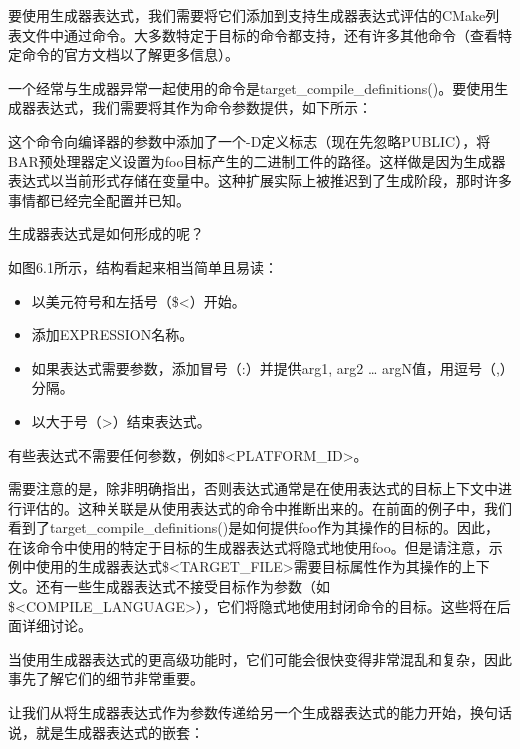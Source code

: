 
要使用生成器表达式，我们需要将它们添加到支持生成器表达式评估的CMake列表文件中通过命令。大多数特定于目标的命令都支持，还有许多其他命令（查看特定命令的官方文档以了解更多信息）。

一个经常与生成器异常一起使用的命令是target\_compile\_definitions()。要使用生成器表达式，我们需要将其作为命令参数提供，如下所示：


这个命令向编译器的参数中添加了一个-D定义标志（现在先忽略PUBLIC），将BAR预处理器定义设置为foo目标产生的二进制工件的路径。这样做是因为生成器表达式以当前形式存储在变量中。这种扩展实际上被推迟到了生成阶段，那时许多事情都已经完全配置并已知。

生成器表达式是如何形成的呢？


如图6.1所示，结构看起来相当简单且易读：

\begin{itemize}
\item
以美元符号和左括号（\$<）开始。

\item
添加EXPRESSION名称。

\item
如果表达式需要参数，添加冒号（:）并提供arg1, arg2 … argN值，用逗号（,）分隔。

\item
以大于号（>）结束表达式。
\end{itemize}

有些表达式不需要任何参数，例如\$<PLATFORM\_ID>。

需要注意的是，除非明确指出，否则表达式通常是在使用表达式的目标上下文中进行评估的。这种关联是从使用表达式的命令中推断出来的。在前面的例子中，我们看到了target\_compile\_definitions()是如何提供foo作为其操作的目标的。因此，在该命令中使用的特定于目标的生成器表达式将隐式地使用foo。但是请注意，示例中使用的生成器表达式\$<TARGET\_FILE>需要目标属性作为其操作的上下文。还有一些生成器表达式不接受目标作为参数（如\$<COMPILE\_LANGUAGE>），它们将隐式地使用封闭命令的目标。这些将在后面详细讨论。

当使用生成器表达式的更高级功能时，它们可能会很快变得非常混乱和复杂，因此事先了解它们的细节非常重要。


让我们从将生成器表达式作为参数传递给另一个生成器表达式的能力开始，换句话说，就是生成器表达式的嵌套：

